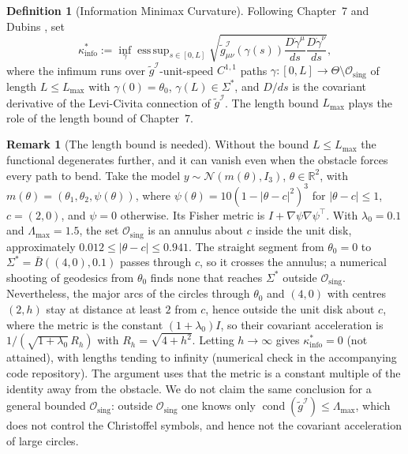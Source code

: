\documentclass[11pt,reqno]{amsart}
\theoremstyle{definition}
\newtheorem{definition}[theorem]{Definition}
\newtheorem{remark}[theorem]{Remark}
\providecommand{\R}{\mathbb{R}}
\newcommand{\Fisher}{\mathcal{I}}
\numberwithin{equation}{section}
\providecommand{\R}{\mathbb{R}}
\begin{document}
\begin{definition}[Information Minimax Curvature]
Following Chapter~7 \cite{silvafilho2026minimax} and Dubins \cite{dubins1957}, set
\begin{equation}
\kappa^*_{\mathrm{info}} := \inf_{\gamma} \operatorname{ess\,sup}_{s \in [0, L]} \sqrt{ \tilde{g}^{\Fisher}_{\mu\nu}(\gamma(s)) \frac{D \dot{\gamma}^\mu}{ds} \frac{D \dot{\gamma}^\nu}{ds} },
\end{equation}
where the infimum runs over $\tilde g^{\Fisher}$-unit-speed $C^{1,1}$ paths $\gamma: [0, L] \to \Theta \setminus \mathcal{O}_{\mathrm{sing}}$ of length $L \le L_{\max}$ with $\gamma(0) = \theta_0$, $\gamma(L) \in \Sigma^*$, and $D/ds$ is the covariant derivative of the Levi-Civita connection of $\tilde{g}^{\Fisher}$. The length bound $L_{\max}$ plays the role of the length bound of Chapter~7.
\end{definition}

\begin{remark}[The length bound is needed]
\label{rem:length_bound}
Without the bound $L \le L_{\max}$ the functional degenerates further, and it can vanish even when the obstacle forces every path to bend. Take the model $y \sim \mathcal{N}(m(\theta), I_3)$, $\theta \in \R^2$, with $m(\theta) = (\theta_1, \theta_2, \psi(\theta))$, where $\psi(\theta) = 10(1 - |\theta - c|^2)^3$ for $|\theta - c| \le 1$, $c = (2,0)$, and $\psi = 0$ otherwise. Its Fisher metric is $I + \nabla\psi\nabla\psi^\top$. With $\lambda_0 = 0.1$ and $\Lambda_{\max} = 1.5$, the set $\mathcal{O}_{\mathrm{sing}}$ is an annulus about $c$ inside the unit disk, approximately $0.012 \le |\theta - c| \le 0.941$. The straight segment from $\theta_0 = 0$ to $\Sigma^* = \bar B((4,0), 0.1)$ passes through $c$, so it crosses the annulus; a numerical shooting of geodesics from $\theta_0$ finds none that reaches $\Sigma^*$ outside $\mathcal{O}_{\mathrm{sing}}$. Nevertheless, the major arcs of the circles through $\theta_0$ and $(4,0)$ with centres $(2,h)$ stay at distance at least $2$ from $c$, hence outside the unit disk about $c$, where the metric is the constant $(1+\lambda_0) I$, so their covariant acceleration is $1/(\sqrt{1+\lambda_0}\,R_h)$ with $R_h = \sqrt{4 + h^2}$. Letting $h \to \infty$ gives $\kappa^*_{\mathrm{info}} = 0$ (not attained), with lengths tending to infinity (numerical check in the accompanying code repository). The argument uses that the metric is a constant multiple of the identity away from the obstacle. We do not claim the same conclusion for a general bounded $\mathcal{O}_{\mathrm{sing}}$: outside $\mathcal{O}_{\mathrm{sing}}$ one knows only $\operatorname{cond}(\tilde g^{\Fisher}) \le \Lambda_{\max}$, which does not control the Christoffel symbols, and hence not the covariant acceleration of large circles.
\end{remark}
\end{document}

